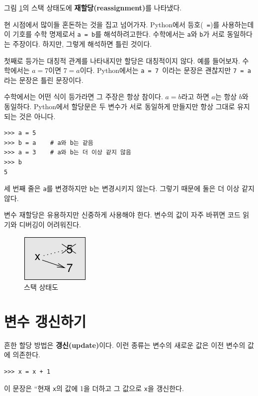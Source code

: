 \documentclass[10pt]{book}
\begin{document}
그림 \ref{fig.assign2}의 스택 상태도에 {\bf 재할당(reassignment)}를 나타냈다.  
 

현 시점에서 많이들 혼돈하는 것을 집고 넘어가자.  Python에서 등호({\tt
  =})를 사용하는데 이 기호를 수학 명제로서 {\tt a = b}를
해석하려고한다.  수학에서는 {\tt a}와 {\tt b}가 서로 동일하다는
주장이다.  하지만, 그렇게 해석하면 틀린 것이다. 


첫째로 등가는 대칭적 관계를 나타내지만 할당은 대칭적이지 않다.  예를
들어보자.  수학에서는 $a = 7$이면 $7 = a$이다.  Python에서는 {\tt a =
  7 }이라는 문장은 괜찮지만 {\tt 7 = a}라는 문장은 틀린 문장이다.


수학에서는 어떤 식이 등가라면 그 주장은 항상 참이다.  $a = b$라고 하면
$a$는 항상 $b$와 동일하다.  Python에서 할당문은 두 변수가 서로 동일하게
만들지만 항상 그대로 유지되는 것은 아니다.


\begin{verbatim}
>>> a = 5
>>> b = a    # a와 b는 같음
>>> a = 3    # a와 b는 더 이상 같지 않음
>>> b
5
\end{verbatim}
%
세 번째 줄은 {\tt a}를 변경하지만 {\tt b}는 변경시키지 않는다. 그렇기
때문에 둘은 더 이상 같지 않다.

변수 재할당은 유용하지만 신중하게 사용해야 한다.  변수의 값이 자주
바뀌면 코드 읽기와 디버깅이 어려워진다.

\begin{figure}
\centerline
{\includegraphics[scale=0.8]{figs/assign2.pdf}}
\caption{스택 상태도}
\label{fig.assign2}
\end{figure}



\section{변수 갱신하기}
\label{update}


흔한 할당 방법은 {\bf 갱신(update)}이다.  이런 종류는 변수의 새로운
값은 이전 변수의 값에 의존한다.

\begin{verbatim}
>>> x = x + 1
\end{verbatim}
%
이 문장은 ``현재 {\tt x}의 값에 1을 더하고 그 값으로 {\tt x}을 갱신한다. 
\end{document}
